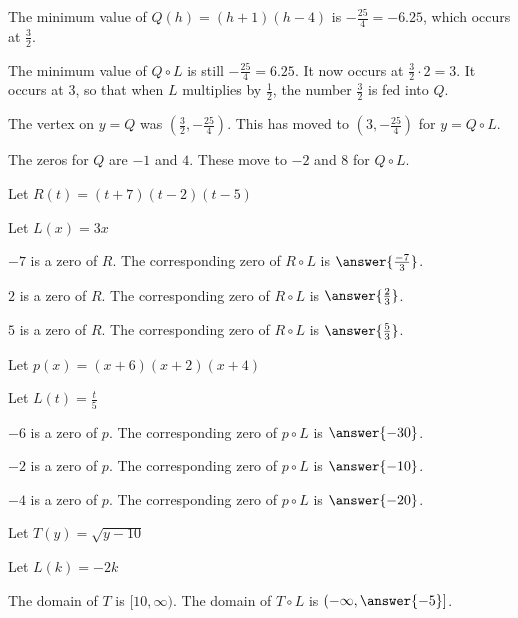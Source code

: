 \documentclass{ximera}
\begin{document}
The minimum value of $Q(h) = (h+1)(h-4)$ is $-\frac{25}{4} = -6.25$, which occurs at $\frac{3}{2}$. 

The minimum value of $Q \circ L$ is still $-\frac{25}{4} = 6.25$. It now occurs at $\frac{3}{2} \cdot 2 = 3$.  It occurs at $3$, so that when $L$ multiplies by $\frac{1}{2}$, the number $\frac{3}{2}$ is fed into $Q$. 


The vertex on $y = Q$ was $\left (\frac{3}{2}, -\frac{25}{4} \right)$. This has moved to $\left (3, -\frac{25}{4} \right)$ for $y = Q \circ L$.


The zeros for $Q$ are $-1$ and $4$.  These move to $-2$ and $8$ for $Q \circ L$.  




\begin{question}


Let $R(t) = (t+7)(t-2)(t-5)$ 

Let $L(x) = 3x$ 


$-7$ is a zero of $R$.  The corresponding zero of $R \circ L$ is $\answer{\frac{-7}{3}}$.

$2$ is a zero of $R$.  The corresponding zero of $R \circ L$ is $\answer{\frac{2}{3}}$.

$5$ is a zero of $R$.  The corresponding zero of $R \circ L$ is $\answer{\frac{5}{3}}$.


\end{question}












\begin{question}


Let $p(x) = (x+6)(x+2)(x+4)$ 

Let $L(t) = \frac{t}{5}$ 


$-6$ is a zero of $p$.  The corresponding zero of $p \circ L$ is $\answer{-30}$.

$-2$ is a zero of $p$.  The corresponding zero of $p \circ L$ is $\answer{-10}$.

$-4$ is a zero of $p$.  The corresponding zero of $p \circ L$ is $\answer{-20}$.


\end{question}










\begin{question}


Let $T(y) = \sqrt{y-10}$ 

Let $L(k) = -2k$ 


The domain of $T$ is $[10, \infty)$.  The domain of $T \circ L$ is $\left( -\infty, \answer{-5} \right]$.


\end{question}
\end{document}
